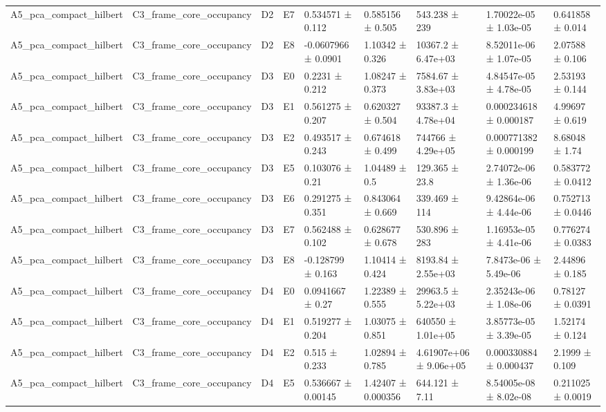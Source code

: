 \begin{table}
\begin{tabular}{lllllllll}
A5\_pca\_compact\_hilbert & C3\_frame\_core\_occupancy & D2 & E7 & 0.534571 ± 0.112 & 0.585156 ± 0.505 & 543.238 ± 239 & 1.70022e-05 ± 1.03e-05 & 0.641858 ± 0.014 \\
A5\_pca\_compact\_hilbert & C3\_frame\_core\_occupancy & D2 & E8 & -0.0607966 ± 0.0901 & 1.10342 ± 0.326 & 10367.2 ± 6.47e+03 & 8.52011e-06 ± 1.07e-05 & 2.07588 ± 0.106 \\
A5\_pca\_compact\_hilbert & C3\_frame\_core\_occupancy & D3 & E0 & 0.2231 ± 0.212 & 1.08247 ± 0.373 & 7584.67 ± 3.83e+03 & 4.84547e-05 ± 4.78e-05 & 2.53193 ± 0.144 \\
A5\_pca\_compact\_hilbert & C3\_frame\_core\_occupancy & D3 & E1 & 0.561275 ± 0.207 & 0.620327 ± 0.504 & 93387.3 ± 4.78e+04 & 0.000234618 ± 0.000187 & 4.99697 ± 0.619 \\
A5\_pca\_compact\_hilbert & C3\_frame\_core\_occupancy & D3 & E2 & 0.493517 ± 0.243 & 0.674618 ± 0.499 & 744766 ± 4.29e+05 & 0.000771382 ± 0.000199 & 8.68048 ± 1.74 \\
A5\_pca\_compact\_hilbert & C3\_frame\_core\_occupancy & D3 & E5 & 0.103076 ± 0.21 & 1.04489 ± 0.5 & 129.365 ± 23.8 & 2.74072e-06 ± 1.36e-06 & 0.583772 ± 0.0412 \\
A5\_pca\_compact\_hilbert & C3\_frame\_core\_occupancy & D3 & E6 & 0.291275 ± 0.351 & 0.843064 ± 0.669 & 339.469 ± 114 & 9.42864e-06 ± 4.44e-06 & 0.752713 ± 0.0446 \\
A5\_pca\_compact\_hilbert & C3\_frame\_core\_occupancy & D3 & E7 & 0.562488 ± 0.102 & 0.628677 ± 0.678 & 530.896 ± 283 & 1.16953e-05 ± 4.41e-06 & 0.776274 ± 0.0383 \\
A5\_pca\_compact\_hilbert & C3\_frame\_core\_occupancy & D3 & E8 & -0.128799 ± 0.163 & 1.10414 ± 0.424 & 8193.84 ± 2.55e+03 & 7.8473e-06 ± 5.49e-06 & 2.44896 ± 0.185 \\
A5\_pca\_compact\_hilbert & C3\_frame\_core\_occupancy & D4 & E0 & 0.0941667 ± 0.27 & 1.22389 ± 0.555 & 29963.5 ± 5.22e+03 & 2.35243e-06 ± 1.08e-06 & 0.78127 ± 0.0391 \\
A5\_pca\_compact\_hilbert & C3\_frame\_core\_occupancy & D4 & E1 & 0.519277 ± 0.204 & 1.03075 ± 0.851 & 640550 ± 1.01e+05 & 3.85773e-05 ± 3.39e-05 & 1.52174 ± 0.124 \\
A5\_pca\_compact\_hilbert & C3\_frame\_core\_occupancy & D4 & E2 & 0.515 ± 0.233 & 1.02894 ± 0.785 & 4.61907e+06 ± 9.06e+05 & 0.000330884 ± 0.000437 & 2.1999 ± 0.109 \\
A5\_pca\_compact\_hilbert & C3\_frame\_core\_occupancy & D4 & E5 & 0.536667 ± 0.00145 & 1.42407 ± 0.000356 & 644.121 ± 7.11 & 8.54005e-08 ± 8.02e-08 & 0.211025 ± 0.0019 \\

\end{tabular}
\end{table}
